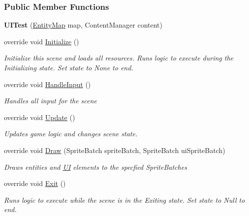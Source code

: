 \subsubsection*{Public Member Functions}
\begin{DoxyCompactItemize}
\item 
\hypertarget{class_m_b2_d_1_1_testing_1_1_u_i_test_a992dea4865eafb48b8453b1cbd5f6da5}{}\label{class_m_b2_d_1_1_testing_1_1_u_i_test_a992dea4865eafb48b8453b1cbd5f6da5} 
{\bfseries U\+I\+Test} (\hyperlink{class_m_b2_d_1_1_entity_component_1_1_entity_map}{Entity\+Map} map, Content\+Manager content)
\item 
override void \hyperlink{class_m_b2_d_1_1_testing_1_1_u_i_test_af6f33faaa93d646edd5c74dfee6139d1}{Initialize} ()
\begin{DoxyCompactList}\small\item\em Initialize this scene and loads all resources. Runs logic to execute during the Initializing state. Set state to None to end. \end{DoxyCompactList}\item 
override void \hyperlink{class_m_b2_d_1_1_testing_1_1_u_i_test_abfdabac63f2f6dd07e49c181ce84b24d}{Handle\+Input} ()
\begin{DoxyCompactList}\small\item\em Handles all input for the scene \end{DoxyCompactList}\item 
override void \hyperlink{class_m_b2_d_1_1_testing_1_1_u_i_test_a547d5592fee47d4c9354ee8f307c8813}{Update} ()
\begin{DoxyCompactList}\small\item\em Updates game logic and changes scene state. \end{DoxyCompactList}\item 
override void \hyperlink{class_m_b2_d_1_1_testing_1_1_u_i_test_a9656d2d62517288a7b4387dafe741ea0}{Draw} (Sprite\+Batch sprite\+Batch, Sprite\+Batch ui\+Sprite\+Batch)
\begin{DoxyCompactList}\small\item\em Draws entities and \hyperlink{namespace_m_b2_d_1_1_u_i}{UI} elements to the specfied Sprite\+Batches \end{DoxyCompactList}\item 
override void \hyperlink{class_m_b2_d_1_1_testing_1_1_u_i_test_ad7ad379db3fc9990e634b3edbd4b1a41}{Exit} ()
\begin{DoxyCompactList}\small\item\em Runs logic to execute while the scene is in the Exiting state. Set state to Null to end. \end{DoxyCompactList}\item 

\end{DoxyCompactItemize}
